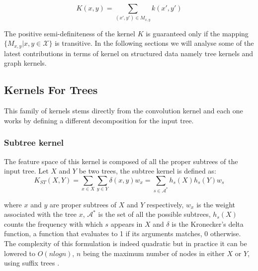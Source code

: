 \begin{equation}
    K(x,y) = \sum_{(x',y') \in M_{x,y}} k(x',y')
\end{equation}

The positive semi-definiteness of the kernel $K$ is guaranteed only if the
mapping $\{M_{x,y}|x,y \in \mathcal{X}\}$ is transitive.
In the following sections we will analyse some of the latest contributions in terms
of kernel on structured data namely tree kernels and graph kernels.

\subsection{Kernels For Trees}
This family of kernels stems directly from the convolution kernel and each one
works by defining a different decomposition for the input tree.

\subsubsection{Subtree kernel}
\label{subsubsec:st}
The feature space of this kernel is composed of all the proper subtrees of the
input tree.
Let $X$ and $Y$ be two trees, the  subtree kernel is defined as:
\begin{equation}
    K_{ST}(X,Y) = \sum_{x \in X} \sum_{y \in Y} \delta(x,y)w_x =
    \sum_{s \in \mathcal{A}^*} h_s(X)h_s(Y)w_s
\end{equation}

where $x$ and $y$ are proper subtrees of $X$ and $Y$ respectively, $w_x$ is the 
weight associated with the tree $x$, $\mathcal{A}^*$ is the set of all the possible
subtrees, $h_s(X)$ counts the frequency with which $s$ appears in $X$ and
$\delta$ is the Kronecker's delta function, a function that evaluates to 1 if its
arguments matches, 0 otherwise.
The complexity of this formulation is indeed quadratic but in practice it can be
lowered to $O(nlogn)$, $n$ being the maximum number of nodes in either $X$ or $Y$,
using suffix trees \cite{viswanathan04fastkernels}.

